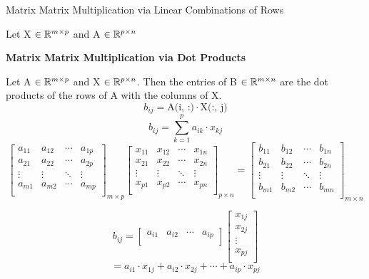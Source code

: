 \documentclass[12pt]{article}
\begin{document}
\begin{defin}{Matrix Matrix Multiplication via Linear Combinations of Rows}

    Let X $\in \mathbb{R}^{m \times p}$ and A $\in \mathbb{R}^{p \times n}$
\end{defin}

\begin{defin}{}
\textbf{Matrix Matrix Multiplication via Dot Products}
    
    Let A $\in \mathbb{R}^{m \times p}$ and X $\in \mathbb{R}^{p \times n}$. Then the entries of B $\in \mathbb{R}^{m \times n}$ are the dot products of the rows of A with the columns of X.
    \[ b_{ij} = \text{A(i, :)} \cdot \text{X(:, j)}\]
    \[ b_{ij} = \sum_{k=1}^{p} a_{ik} \cdot x_{kj}\]
    \[
    \begin{bmatrix}
        a_{11} & a_{12} & \cdots & a_{1p} \\
        a_{21} & a_{22} & \cdots & a_{2p} \\
        \vdots & \vdots & \ddots & \vdots    \\
        a_{m1} & a_{m2} & \cdots & a_{mp} \\
    \end{bmatrix}_{m \times p}
    \begin{bmatrix}
        x_{11} & x_{12} & \cdots & x_{1n} \\
        x_{21} & x_{22} & \cdots & x_{2n} \\
        \vdots & \vdots & \ddots & \vdots    \\
        x_{p1} & x_{p2} & \cdots & x_{pn} \\
    \end{bmatrix}_{p \times n}
    =
    \begin{bmatrix}
        b_{11} & b_{12} & \cdots & b_{1n} \\
        b_{21} & b_{22} & \cdots & b_{2n} \\
        \vdots & \vdots & \ddots & \vdots    \\
        b_{m1} & b_{m2} & \cdots & b_{mn} \\
    \end{bmatrix}_{m \times n}
    \]

    \[
    b_{ij}
    =
    \begin{bmatrix}
        a_{i1} & a_{i2} & \cdots & a_{ip} \\
    \end{bmatrix}
    \begin{bmatrix}
        x_{1j} \\ x_{2j} \\ \vdots \\ x_{pj} \\
    \end{bmatrix}
    \]
    \[
    = a_{i1} \cdot x_{1j} + a_{i2} \cdot x_{2j} + \cdots + a_{ip} \cdot x_{pj}
    \]
    
\end{defin}
\end{document}

